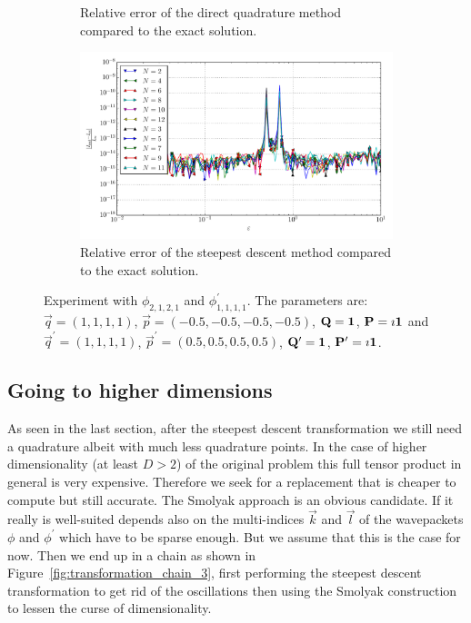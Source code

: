 \documentclass[a4paper,10pt]{article}
\begin{document}
\begin{figure}[ht!]
\begin{subfigure}[t]{0.5\linewidth}
    \caption{Relative error of the direct quadrature method compared to the exact solution.}
    \label{fig:tp_4d_conv_eps_2121_1111_err_rel_qr}
  \end{subfigure}
  \begin{subfigure}[t]{0.5\linewidth}
    \includegraphics[width=\linewidth]{./plots/tp_4d_conv_eps_(2,1,2,1)_(1,1,1,1)_err_rel_nsd.pdf}
    \caption{Relative error of the steepest descent method compared to the exact solution.}
    \label{fig:tp_4d_conv_eps_2121_1111_err_rel_nsd}
  \end{subfigure}
  \label{fig:tp_4d_conv_eps_2121_1111}
  \caption{Experiment with $\phi_{2,1,2,1}$ and $\phi_{1,1,1,1}^{\prime}$.
  The parameters are:
  $\vec{q} = (1, 1, 1, 1)$,
  $\vec{p} = (-0.5, -0.5, -0.5, -0.5)$,
  $\mathbf{Q} = \mathbf{1}$,
  $\mathbf{P} = \imath \mathbf{1}$
  and
  $\vec{q}^\prime = (1, 1, 1, 1)$,
  $\vec{p}^\prime = (0.5, 0.5, 0.5, 0.5)$,
  $\mathbf{Q}^\prime = \mathbf{1}$,
  $\mathbf{P}^\prime = \imath \mathbf{1}$.}
\end{figure}


\FloatBarrier
\subsection{Going to higher dimensions}


As seen in the last section, after the steepest descent transformation we still
need a quadrature albeit with much less quadrature points. In the case of higher
dimensionality (at least $D > 2$) of the original problem this full tensor product
in general is very expensive. Therefore we seek for a replacement that is cheaper
to compute but still accurate. The Smolyak approach is an obvious candidate.
If it really is well-suited depends also on the multi-indices $\vec{k}$ and
$\vec{l}$ of the wavepackets $\phi$ and $\phi^\prime$ which have to be sparse
enough. But we assume that this is the case for now. Then we end up in a chain
as shown in Figure~\ref{fig:transformation_chain_3}, first performing the steepest
descent transformation to get rid of the oscillations then using the Smolyak
construction to lessen the curse of dimensionality.
\end{document}

